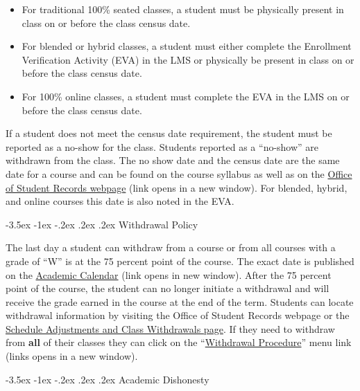 \documentclass{article}
\makeatletter
\renewcommand\section{\@startsection{section}{1}{0pt}%
  {-3.5ex \@plus -1ex \@minus -.2ex}%
  {.2ex \@plus.2ex}%
  {\normalfont\Large\bfseries}} %
\makeatother
\begin{document}
\begin{itemize}
\item For traditional 100\% seated classes, a student must be physically present in class on or before the class census date.


\item For blended or hybrid classes, a student must either complete the Enrollment Verification Activity (EVA) in the LMS or physically be present in class on or before the class census date.


\item For 100\% online classes, a student must complete the EVA in the LMS on or before the class census date.
\end{itemize}

If a student does not meet the census date requirement, the student must be reported as a no-show for the class. Students reported as a ``no-show'' are withdrawn from the class.  The no show date and the census date are the same date for a course and can be found on the course syllabus as well as on the \href{https://mitchellcc.edu/office-student-records}{Office of Student Records webpage} (link opens in a new window). For blended, hybrid, and online courses this date is also noted in the EVA.

\section{Withdrawal Policy}

The last day a student can withdraw from a course or from all courses with a grade of ``W'' is at the 75 percent point of the course. The exact date is published on the \href{https://www.mitchellcc.edu/wp-content/uploads/2024/05/2024-2025-Academic-Calendar.pdf}{Academic Calendar} (link opens in new window). After the 75 percent point of the course, the student can no longer initiate a withdrawal and will receive the grade earned in the course at the end of the term. Students can locate withdrawal information by visiting the Office of Student Records webpage or the \href{https://www.mitchellcc.edu/schedule-adjustments-and-class-withdrawals/}{Schedule Adjustments and Class Withdrawals page}. If they need to withdraw from \textbf{all} of their classes they can click on the ``\href{https://mitchellcc.edu/withdrawal-procedure}{Withdrawal Procedure}'' menu link (links opens in a new window).

\section{Academic Dishonesty}
\end{document}
